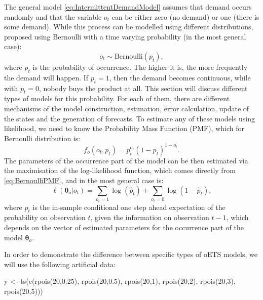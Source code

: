 \documentclass[
]{book}
\newenvironment{Shaded}{\begin{snugshade}}{\end{snugshade}}
\newcommand{\DecValTok}[1]{\textcolor[rgb]{0.00,0.00,0.81}{#1}}
\newcommand{\FloatTok}[1]{\textcolor[rgb]{0.00,0.00,0.81}{#1}}
\newcommand{\FunctionTok}[1]{\textcolor[rgb]{0.00,0.00,0.00}{#1}}
\newcommand{\NormalTok}[1]{#1}
\newcommand{\OtherTok}[1]{\textcolor[rgb]{0.56,0.35,0.01}{#1}}
\theoremstyle{definition}
\theoremstyle{definition}
\theoremstyle{definition}
\theoremstyle{definition}
\theoremstyle{remark}
\begin{document}
The general model \eqref{eq:IntermittentDemandModel} assumes that demand occurs randomly and that the variable \(o_t\) can be either zero (no demand) or one (there is some demand). While this process can be modelled using different distributions, \citet{Svetunkov2019a} proposed using Bernoulli with a time varying probability (in the most general case):
\begin{equation}
    o_t \sim \text{Bernoulli} \left(p_t \right) ,
  \label{eq:OccurrenceModelBernoulli}
\end{equation}
where \(p_t\) is the probability of occurrence. The higher it is, the more frequently the demand will happen. If \(p_t=1\), then the demand becomes continuous, while with \(p_t=0\), nobody buys the product at all. This section will discuss different types of models for this probability. For each of them, there are different mechanisms of the model construction, estimation, error calculation, update of the states and the generation of forecasts. To estimate any of these models using likelihood, we need to know the Probability Mass Function (PMF), which for Bernoulli distribution is:
\begin{equation}
    f_o(o_t, p_t) = p_t^{o_t}(1-p_t)^{1-o_t}.
  \label{eq:BernoulliPMF}
\end{equation}
The parameters of the occurrence part of the model can be then estimated via the maximisation of the log-likelihood function, which comes directly from \eqref{eq:BernoulliPMF}, and in the most general case is:
\begin{equation}
    \ell \left(\boldsymbol{\theta}_o | o_t \right) = \sum_{o_t=1} \log(\hat{p}_t) + \sum_{o_t=0} \log(1-\hat{p}_t) ,
  \label{eq:oETSLikelihood}
\end{equation}
where \(\hat{p}_t\) is the in-sample conditional one step ahead expectation of the probability on observation \(t\), given the information on observation \(t-1\), which depends on the vector of estimated parameters for the occurrence part of the model \(\boldsymbol{\theta}_o\).

In order to demonstrate the difference between specific types of oETS models, we will use the following artificial data:

\begin{Shaded}
\begin{Highlighting}[]
\NormalTok{y }\OtherTok{\textless{}{-}} \FunctionTok{ts}\NormalTok{(}\FunctionTok{c}\NormalTok{(}\FunctionTok{rpois}\NormalTok{(}\DecValTok{20}\NormalTok{,}\FloatTok{0.25}\NormalTok{), }\FunctionTok{rpois}\NormalTok{(}\DecValTok{20}\NormalTok{,}\FloatTok{0.5}\NormalTok{), }\FunctionTok{rpois}\NormalTok{(}\DecValTok{20}\NormalTok{,}\DecValTok{1}\NormalTok{),}
          \FunctionTok{rpois}\NormalTok{(}\DecValTok{20}\NormalTok{,}\DecValTok{2}\NormalTok{), }\FunctionTok{rpois}\NormalTok{(}\DecValTok{20}\NormalTok{,}\DecValTok{3}\NormalTok{), }\FunctionTok{rpois}\NormalTok{(}\DecValTok{20}\NormalTok{,}\DecValTok{5}\NormalTok{)))}
\end{Highlighting}
\end{Shaded}
\end{document}
